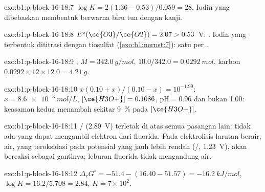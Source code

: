 \begin{solution}{exo:b1:p-block-16-18:7}
$\log K = 2(1.36 - 0.53)/0.059 = 28$. Iodin yang dibebaskan membentuk
 berwarna biru tua dengan kanji.
\end{solution}

\begin{solution}{exo:b1:p-block-16-18:8}
$E^\circ(\ce{O3}/\ce{O2}) = 2.07 > 0.53$~V: . Iodin yang terbentuk dititrasi dengan tiosulfat
(\cref{exo:b1:nernst:7}): satu  per .
\end{solution}

\begin{solution}{exo:b1:p-block-16-18:9}
; $M = \qty{342.0}{g/mol}$, $10.0/342.0 =
\qty{0.0292}{mol}$, karbon $0.0292 \times 12 \times 12.0 = \qty{4.21}{g}$.
\end{solution}

\begin{solution}{exo:b1:p-block-16-18:10}
$x(0.10 + x)/(0.10 - x) = 10^{-1.99}$: $x = \qty{8.6e-3}{mol/L}$,
$[\ce{H3O+}] = 0.1086$, $\mathrm{pH} = 0.96$ dan bukan 1.00: keasaman
kedua menambah sekitar \qty{9}{\percent} pada $[\ce{H3O+}]$.
\end{solution}

\begin{solution}{exo:b1:p-block-16-18:11}
/ (2.89~V) terletak di atas semua pasangan lain: tidak ada
 yang dapat mengambil elektron dari fluorida. Pada elektrolisis
larutan berair, air, yang teroksidasi pada potensial yang jauh lebih
rendah (/, 1.23~V), akan bereaksi sebagai gantinya; leburan
fluorida tidak mengandung air.
\end{solution}

\begin{solution}{exo:b1:p-block-16-18:12}
$\Delta_r G^\circ = -51.4 - (16.40 - 51.57) = \qty{-16.2}{kJ/mol}$,
$\log K = 16.2/5.708 = 2.84$, $K = 7 \times 10^2$.
\end{solution}

